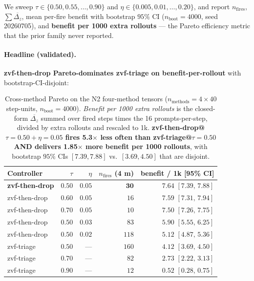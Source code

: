 We sweep $\tau \in \{0.50, 0.55, \ldots, 0.90\}$ and
$\eta \in \{0.005, 0.01, \ldots, 0.20\}$, and report
$n_{\mathrm{fires}}$, $\sum \overline{\Delta_z}$, mean per-fire benefit
with bootstrap $95\%$ CI ($n_{\mathrm{boot}}{=}4000$, seed 20260705),
and \textbf{benefit per 1000 extra rollouts} --- the Pareto
efficiency metric that the prior family never reported.

\paragraph{Headline (validated).}
\textbf{zvf-then-drop Pareto-dominates zvf-triage on benefit-per-rollout}
with bootstrap-CI-disjoint:

\begin{table}[t]
\centering
\caption{Cross-method Pareto on the N2 four-method tensors
($n_{\mathrm{methods}}{=}4 \times 40$ step-units, $n_{\mathrm{boot}}{=}4000$).
\emph{Benefit per 1000 extra rollouts} is the closed-form
$\overline{\Delta_z}$ summed over fired steps times the 16
prompts-per-step, divided by extra rollouts and rescaled to 1k.
\textbf{zvf-then-drop@$\tau{=}0.50{+}\eta{=}0.05$ fires 5.3$\times$ less
often than zvf-triage@$\tau{=}0.50$ AND delivers 1.85$\times$ more
benefit per 1000 rollouts}, with bootstrap $95\%$ CIs $[7.39, 7.88]$
vs.\ $[3.69, 4.50]$ that are disjoint.}
\label{tab:p7-iter91-pareto}
\begin{tabular}{lrrrr}
\toprule
\textbf{Controller} & $\tau$ & $\eta$ & $n_{\mathrm{fires}}$ (4 m) & benefit / 1k [95\% CI] \\
\midrule
\textbf{zvf-then-drop} & $0.50$ & $\mathbf{0.05}$ & $\mathbf{30}$ & $\mathbf{7.64}$ $[7.39,\, 7.88]$ \\
zvf-then-drop           & $0.60$ & $0.05$ & $16$        & $7.59$ $[7.31,\, 7.94]$ \\
zvf-then-drop           & $0.70$ & $0.05$ & $10$        & $7.50$ $[7.26,\, 7.75]$ \\
zvf-then-drop           & $0.50$ & $0.03$ & $83$        & $5.90$ $[5.55,\, 6.25]$ \\
zvf-then-drop           & $0.50$ & $0.02$ & $118$       & $5.12$ $[4.87,\, 5.36]$ \\
\midrule
zvf-triage              & $0.50$ & ---    & $160$       & $4.12$ $[3.69,\, 4.50]$ \\
zvf-triage              & $0.70$ & ---    & $82$        & $2.73$ $[2.22,\, 3.13]$ \\
zvf-triage              & $0.90$ & ---    & $12$        & $0.52$ $[0.28,\, 0.75]$ \\
\bottomrule
\end{tabular}
\end{table}

